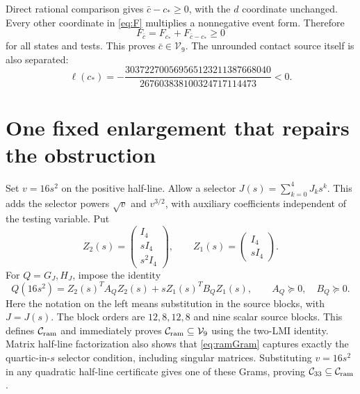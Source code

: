 \documentclass[10pt]{article}
\newcommand{\V}{\mathcal V_9}
\newcommand{\Cq}{\mathcal C_{33}}
\newcommand{\Cr}{\mathcal C_{\rm ram}}
\begin{document}
Direct rational comparison gives $\bar c-c_*\geq0$, with the $d$ coordinate
unchanged. Every other coordinate in \eqref{eq:F} multiplies a nonnegative
event form. Therefore
\[
                       F_{\bar c}=F_{c_*}+F_{\bar c-c_*}\geq0
\]
for all states and tests. This proves $\bar c\in\V$. The unrounded contact
source itself is also separated:
\begin{equation}
\ell(c_*)=-\frac{303722700569565123211387668040}
                    {267603838100324717114473}<0.           \label{eq:oldnegative}
\end{equation}

\section{One fixed enlargement that repairs the obstruction}
\label{sec:enlargement}
Set $v=16s^2$ on the positive half-line. Allow a selector
$J(s)=\sum_{k=0}^4J_ks^k$. This adds the selector powers $\sqrt v$ and
$v^{3/2}$, with auxiliary coefficients independent of the testing variable.
Put
\[
Z_2(s)=\begin{pmatrix}I_4\\sI_4\\s^2I_4\end{pmatrix},
\qquad Z_1(s)=\begin{pmatrix}I_4\\sI_4\end{pmatrix}.
\]
For $Q=G_J,H_J$, impose the identity
\begin{equation}
Q(16s^2)=Z_2(s)^TA_QZ_2(s)+sZ_1(s)^TB_QZ_1(s),
\qquad A_Q\succeq0,\quad B_Q\succeq0.                    \label{eq:ramGram}
\end{equation}
Here the notation on the left means substitution in the source blocks,
with $J=J(s)$. The block orders are $12,8,12,8$ and nine scalar source
blocks. This defines $\Cr$ and immediately proves $\Cr\subseteq\V$
using the two-LMI identity. Matrix half-line factorization also
shows that \eqref{eq:ramGram} captures exactly the quartic-in-$s$ selector
condition, including singular matrices. Substituting $v=16s^2$ in any
quadratic half-line certificate gives one of these Grams, proving
$\Cq\subseteq\Cr$.
\end{document}
